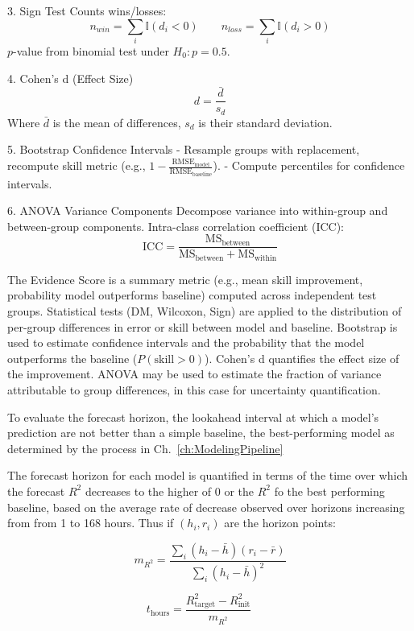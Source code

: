 \documentclass[resources,article,submit,pdftex,moreauthors]{Definitions/mdpi}
\begin{document}
3. Sign Test
Counts wins/losses:
$$
n_{win} = \sum_i \mathbb{I}(d_i < 0) \qquad n_{loss} = \sum_i \mathbb{I}(d_i > 0)
$$
$p$-value from binomial test under $H_0: p=0.5$.

4. Cohen's d (Effect Size)
$$
d = \frac{\bar{d}}{s_d}
$$
Where $\bar{d}$ is the mean of differences, $s_d$ is their standard deviation.

5. Bootstrap Confidence Intervals
- Resample groups with replacement, recompute skill metric (e.g., $1 - \frac{\text{RMSE}_\text{model}}{\text{RMSE}_\text{baseline}}$).
- Compute percentiles for confidence intervals.

6. ANOVA Variance Components
Decompose variance into within-group and between-group components. Intra-class correlation coefficient (ICC):
$$
\text{ICC} = \frac{\text{MS}_{\text{between}}}{\text{MS}_{\text{between}} + \text{MS}_{\text{within}}}
$$

The Evidence Score is a summary metric (e.g., mean skill improvement, probability model outperforms baseline) computed across independent test groups. Statistical tests (DM, Wilcoxon, Sign) are applied to the distribution of per-group differences in error or skill between model and baseline. Bootstrap is used to estimate confidence intervals and the probability that the model outperforms the baseline ($P(\text{skill} > 0)$). Cohen's d quantifies the effect size of the improvement. ANOVA may be used to estimate the fraction of variance attributable to group differences, in this case for uncertainty quantification.


To evaluate the forecast horizon, the lookahead interval at which a model's prediction are not better than a simple baseline, the best-performing model as determined by the process in Ch.~\ref{ch:ModelingPipeline} 

The forecast horizon for each model is quantified in terms of the time over which the forecast $R^2$ decreases to the higher of 0 or the $R^2$ fo the best performing baseline, based on the average rate of decrease observed over horizons increasing from from 1 to 168 hours. Thus if $(h_i, r_i)$ are the horizon points:

\[\label{eq:r2rate}
m_{R^2}
=
\frac{\sum_i (h_i-\bar h)(r_i-\bar r)}{\sum_i (h_i-\bar h)^2}
\]

\[
t_{\text{hours}}=\frac{R^2_{\text{target}}-R^2_{\text{init}}}{m_{R^2}}
\qquad
\]



\end{document}
